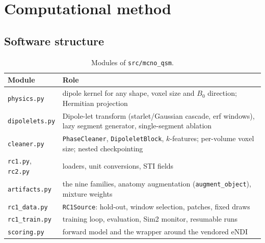 \documentclass[11pt]{article}
\newcommand{\code}[1]{\texttt{#1}}
\theoremstyle{remark}
\begin{document}
\section{Computational method}\label{sec:compute}

\subsection{Software structure}
\begin{table}[h]
\centering\small
\begin{tabular}{@{}lp{10.5cm}@{}}
\toprule
Module & Role \\
\midrule
\code{physics.py} & dipole kernel for any shape, voxel size and $B_0$ direction; Hermitian projection \\
\code{dipolelets.py} & Dipole-let transform (starlet/Gaussian cascade, erf windows), lazy segment generator, single-segment ablation \\
\code{cleaner.py} & \code{PhaseCleaner}, \code{DipoleletBlock}, $k$-features; per-volume voxel size; nested checkpointing \\
\code{rc1.py}, \code{rc2.py} & loaders, unit conversions, STI fields \\
\code{artifacts.py} & the nine families, anatomy augmentation (\code{augment\_object}), mixture weights \\
\code{rc1\_data.py} & \code{RC1Source}: hold-out, window selection, patches, fixed draws \\
\code{rc1\_train.py} & training loop, evaluation, Sim2 monitor, resumable runs \\
\code{scoring.py} & forward model and the wrapper around the vendored eNDI \\
\bottomrule
\end{tabular}
\caption{Modules of \code{src/mcno\_qsm}.}
\end{table}
\end{document}

